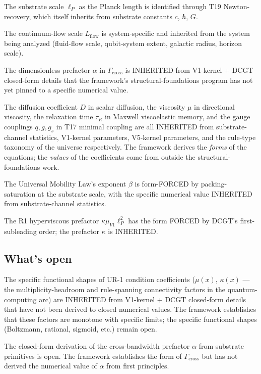 \documentclass[11pt,a4paper]{article}
\begin{document}
The substrate scale $\ell_P$ as the Planck length is identified through T19 Newton-recovery, which itself inherits from substrate constants $c$, $\hbar$, $G$.

The continuum-flow scale $L_{\mathrm{flow}}$ is system-specific and inherited from the system being analyzed (fluid-flow scale, qubit-system extent, galactic radius, horizon scale).

The dimensionless prefactor $\alpha$ in $\Gamma_{\mathrm{cross}}$ is INHERITED from V1-kernel + DCGT closed-form details that the framework's structural-foundations program has not yet pinned to a specific numerical value.

The diffusion coefficient $D$ in scalar diffusion, the viscosity $\mu$ in directional viscosity, the relaxation time $\tau_R$ in Maxwell viscoelastic memory, and the gauge couplings $q, g, g_s$ in T17 minimal coupling are all INHERITED from substrate-channel statistics, V1-kernel parameters, V5-kernel parameters, and the rule-type taxonomy of the universe respectively. The framework derives the \emph{forms} of the equations; the \emph{values} of the coefficients come from outside the structural-foundations work.

The Universal Mobility Law's exponent $\beta$ is form-FORCED by packing-saturation at the substrate scale, with the specific numerical value INHERITED from substrate-channel statistics.

The R1 hyperviscous prefactor $\kappa \mu_{V1} \ell_P^2$ has the form FORCED by DCGT's first-subleading order; the prefactor $\kappa$ is INHERITED.

\subsection{What's open}

The specific functional shapes of UR-1 condition coefficients ($\mu(x)$, $\kappa(x)$ --- the multiplicity-headroom and rule-spanning connectivity factors in the quantum-computing arc) are INHERITED from V1-kernel + DCGT closed-form details that have not been derived to closed numerical values. The framework establishes that these factors are monotone with specific limits; the specific functional shapes (Boltzmann, rational, sigmoid, etc.) remain open.

The closed-form derivation of the cross-bandwidth prefactor $\alpha$ from substrate primitives is open. The framework establishes the form of $\Gamma_{\mathrm{cross}}$ but has not derived the numerical value of $\alpha$ from first principles.
\end{document}
